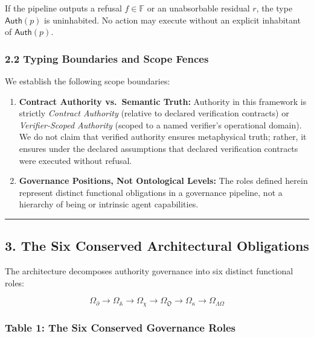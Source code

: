 \documentclass[
  10pt,
]{article}
\begin{document}
If the pipeline outputs a refusal \hypertarget{math-E0018-0019}{}{\(f \in \mathbb{F}\)} or an unabsorbable residual \hypertarget{math-E0019-0020}{}{\(r\)}, the type \hypertarget{math-E0020-0021}{}{\(\mathsf{Auth}(p)\)} is uninhabited. No action may execute without an explicit inhabitant of \hypertarget{math-E0020-0022}{}{\(\mathsf{Auth}(p)\)}.

\subsubsection{2.2 Typing Boundaries and Scope Fences}\label{typing-boundaries-and-scope-fences}

We establish the following scope boundaries:

\begin{enumerate}
\def\labelenumi{\arabic{enumi}.}
\item
  \textbf{Contract Authority vs.~Semantic Truth:} Authority in this framework is strictly \emph{Contract Authority} (relative to declared verification contracts) or \emph{Verifier-Scoped Authority} (scoped to a named verifier's operational domain). We do not claim that verified authority ensures metaphysical truth; rather, it ensures under the declared assumptions that declared verification contracts were executed without refusal.
\item
  \textbf{Governance Positions, Not Ontological Levels:} The roles defined herein represent distinct functional obligations in a governance pipeline, not a hierarchy of being or intrinsic agent capabilities.
\end{enumerate}

\begin{center}\rule{0.5\linewidth}{0.5pt}\end{center}

\subsection{3. The Six Conserved Architectural Obligations}\label{the-six-conserved-architectural-obligations}

The architecture decomposes authority governance into six distinct functional roles:

\hypertarget{math-E0021-0023}{}{\[\Omega_{\partial} \to \Omega_{\mathbb{A}} \to \Omega_{\chi} \to \Omega_{\mathfrak{O}} \to \Omega_{\kappa} \to \Omega_{\Lambda\Omega}\]}

\subsubsection{Table 1: The Six Conserved Governance Roles}\label{table-1-the-six-conserved-governance-roles}
\end{document}
